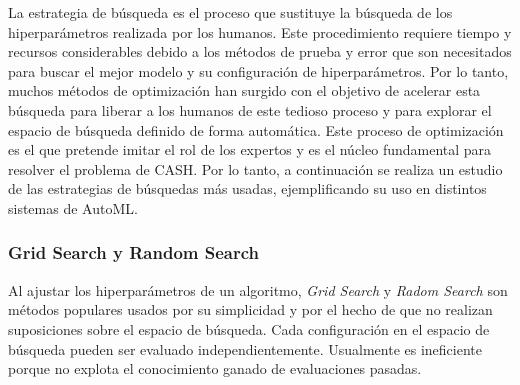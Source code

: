 La estrategia de búsqueda es el proceso que sustituye la búsqueda de los hiperparámetros realizada por los humanos. Este procedimiento requiere tiempo y recursos considerables debido a los métodos de prueba y error que son necesitados para buscar el mejor modelo y su configuración de hiperparámetros. Por lo tanto, muchos métodos de optimización han surgido con el objetivo de acelerar esta búsqueda para liberar a los humanos de este tedioso proceso y para explorar el espacio de búsqueda definido de forma automática. Este proceso de optimización es el que pretende imitar el rol de los expertos y es el núcleo fundamental para resolver el problema de CASH. Por lo tanto, a continuación se realiza un estudio de las estrategias de búsquedas más usadas, ejemplificando su uso en distintos sistemas de AutoML.


\subsubsection{Grid Search y Random Search}


Al ajustar los hiperparámetros de un algoritmo, \textit{Grid Search} y \textit{Radom Search} son métodos populares usados por su simplicidad y por el hecho de que no realizan suposiciones sobre el espacio de búsqueda. Cada configuración en el espacio de búsqueda pueden ser evaluado independientemente. Usualmente es ineficiente porque no explota el conocimiento ganado de evaluaciones pasadas.

